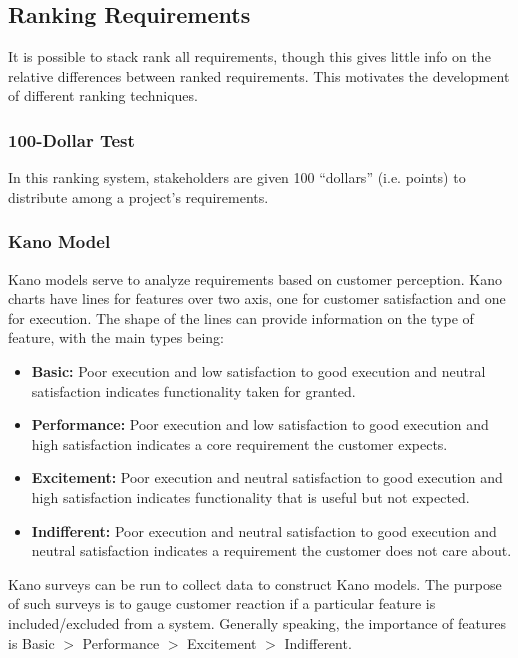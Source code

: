\documentclass[12pt,titlepage]{article}
\begin{document}
    \subsection{Ranking Requirements}
      It is possible to stack rank all requirements, though this gives little info on the relative differences between ranked requirements. This motivates
      the development of different ranking techniques.

      \subsubsection{100-Dollar Test}
        In this ranking system, stakeholders are given 100 ``dollars'' (i.e. points) to distribute among a project's requirements.

      \subsubsection{Kano Model}
        Kano models serve to analyze requirements based on customer perception. Kano charts have lines for features over two axis, one for customer
        satisfaction and one for execution. The shape of the lines can provide information on the type of feature, with the main types being:
        \begin{itemize}
          \item \textbf{Basic:} Poor execution and low satisfaction to good execution and neutral satisfaction indicates functionality taken for granted.
          \item \textbf{Performance:} Poor execution and low satisfaction to good execution and high satisfaction indicates a core requirement
            the customer expects.
          \item \textbf{Excitement:} Poor execution and neutral satisfaction to good execution and high satisfaction indicates functionality
            that is useful but not expected.
          \item \textbf{Indifferent:} Poor execution and neutral satisfaction to good execution and neutral satisfaction indicates a requirement the
            customer does not care about.
        \end{itemize}

        Kano surveys can be run to collect data to construct Kano models. The purpose of such surveys is to gauge customer reaction if a particular feature is
        included/excluded from a system. Generally speaking, the importance of features is Basic $>$ Performance $>$ Excitement $>$ Indifferent.
\end{document}
